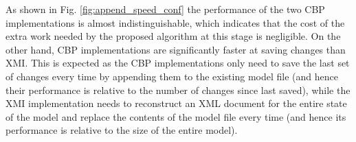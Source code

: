 \documentclass{llncs}
\begin{document}
As shown in Fig. \ref{fig:append_speed_conf} the performance of the two CBP implementations is almost indistinguishable, which indicates that the cost of the extra work needed by the proposed algorithm at this stage is negligible. On the other hand, CBP implementations are significantly faster at saving changes than XMI. This is expected as the CBP implementations only need to save the last set of changes every time by appending them to the existing model file (and hence their performance is relative to the number of changes since last saved), while the XMI implementation needs to reconstruct an XML document for the entire state of the model and replace the contents of the model file every time (and hence its performance is relative to the size of the entire model). 


\end{document}
